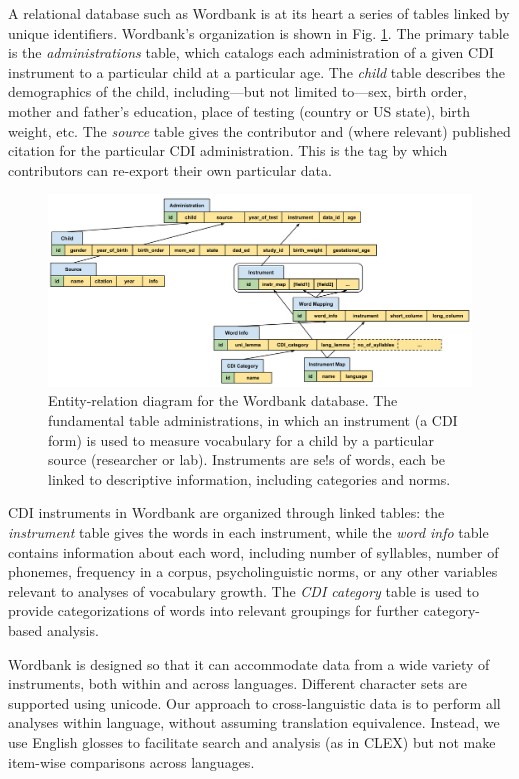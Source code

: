\documentclass[doc,noapacite]{apa2}
\newcommand{\comment}[1]{\marginpar[]{\small \textcolor{blue}{#1}}}
\begin{document}
A relational database such as Wordbank is at its heart a series of tables linked by unique identifiers. Wordbank's organization is shown in Fig. \ref{fig:entities}. \comment{This whole section needs checking/rewriting, it's out of date.} The primary table is the \emph{administrations} table, which catalogs each administration of a given CDI instrument to a particular child at a particular age. The \emph{child} table describes the demographics of the child, including---but not limited to---sex, birth order, mother and father's education, place of testing (country or US state), birth weight, etc. The \emph{source} table gives the contributor and (where relevant) published citation for the particular CDI administration. This is the tag by which contributors can re-export their own particular data.

\begin{figure}[t]
\centering
\includegraphics[width=6in]{figures/entities.pdf}
\caption{\label{fig:entities} Entity-relation diagram for the Wordbank database. The fundamental table administrations, in which an instrument (a CDI form) is used to measure vocabulary for a child by a particular source (researcher or lab). Instruments are se!s of words, each be linked to descriptive information, including categories and norms.}
\end{figure}

CDI instruments in Wordbank are organized through linked tables: the \emph{instrument} table gives the words in each instrument, while the \emph{word info} table contains information about each word, including number of syllables, number of phonemes, frequency in a corpus, psycholinguistic norms, or any other variables relevant to analyses of vocabulary growth. The \emph{CDI category} table is used to provide categorizations of words into relevant groupings for further category-based analysis.

Wordbank is designed so that it can accommodate data from a wide variety of instruments, both within and across languages. Different character sets are supported using unicode. Our approach to cross-languistic data is to perform all analyses within language, without assuming translation equivalence. Instead, we use English glosses to facilitate search and analysis (as in CLEX) but not make item-wise comparisons across languages.
\end{document}

